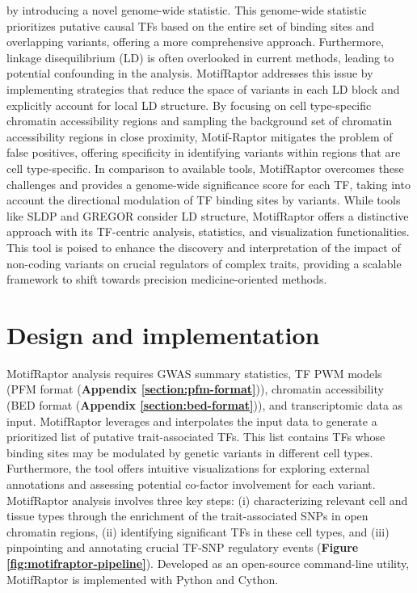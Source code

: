 \documentclass[a4paper, titlepage, openright]{book}
\newcommand{\motifraptor}{MotifRaptor\xspace}
\begin{document}
by introducing a novel genome-wide statistic. This genome-wide statistic prioritizes putative causal TFs based on the entire set of binding sites and overlapping variants, offering a more comprehensive approach. Furthermore, linkage disequilibrium (LD) is often overlooked in current methods, leading to potential confounding in the analysis. \motifraptor addresses this issue by implementing strategies that reduce the space of variants in each LD block and explicitly account for local LD structure. By focusing on cell type-specific chromatin accessibility regions and sampling the background set of chromatin accessibility regions in close proximity, Motif-Raptor mitigates the problem of false positives, offering specificity in identifying variants within regions that are cell type-specific. In comparison to available tools, \motifraptor overcomes these challenges and provides a genome-wide significance score for each TF, taking into account the directional modulation of TF binding sites by variants. While tools like SLDP \citep{reshef2018detecting} and GREGOR \citep{schmidt2015gregor} consider LD structure, \motifraptor offers a distinctive approach with its TF-centric analysis, statistics, and visualization functionalities. This tool is poised to enhance the discovery and interpretation of the impact of non-coding variants on crucial regulators of complex traits, providing a scalable framework to shift towards precision medicine-oriented methods.


\section{Design and implementation}
\motifraptor analysis requires GWAS summary statistics, TF PWM models (PFM format (\textbf{Appendix \ref{section:pfm-format}})), chromatin accessibility (BED format (\textbf{Appendix \ref{section:bed-format}})), and transcriptomic data as input. \motifraptor leverages and interpolates the input data to generate a prioritized list of putative trait-associated TFs. This list contains TFs whose binding sites may be modulated by genetic variants in different cell types. Furthermore, the tool offers intuitive visualizations for exploring external annotations and assessing potential co-factor involvement for each variant. \motifraptor analysis involves three key steps: (i) characterizing relevant cell and tissue types through the enrichment of the trait-associated SNPs in open chromatin regions, (ii) identifying significant TFs in these cell types, and (iii) pinpointing and annotating crucial TF-SNP regulatory events (\textbf{Figure \ref{fig:motifraptor-pipeline}}). Developed as an open-source command-line utility, \motifraptor is implemented with Python and Cython.
\end{document}
